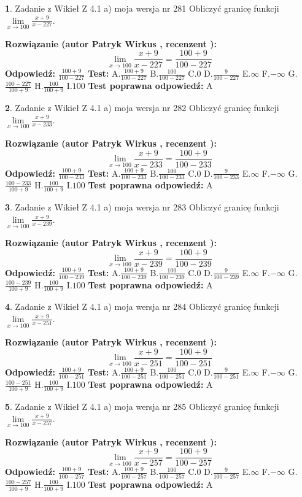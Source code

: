 \documentclass[12pt, a4paper]{article}
\theoremstyle{definition} %
\newtheorem{zad}{}
\newcommand{\zadStart}[1]{\begin{zad}#1\newline}
\newcommand{\zadStop}{\end{zad}}
\newcommand{\rozwStart}[2]{\noindent \textbf{Rozwiązanie (autor #1 , recenzent #2): }\newline}
\newcommand{\rozwStop}{\newline}
\newcommand{\odpStart}{\noindent \textbf{Odpowiedź:}\newline}
\newcommand{\odpStop}{\newline}
\newcommand{\testStart}{\noindent \textbf{Test:}\newline}
\newcommand{\testStop}{\newline}
\newcommand{\kluczStart}{\noindent \textbf{Test poprawna odpowiedź:}\newline}
\newcommand{\kluczStop}{\newline}
\begin{document}
\zadStart{Zadanie z Wikieł Z 4.1 a) moja wersja nr 281}
Obliczyć granicę funkcji $\lim\limits_{x\to100}\frac{x+9}{x-227}$.
\zadStop
\rozwStart{Patryk Wirkus}{}
$$\lim\limits_{x\to100}\frac{x+9}{x-227} = \frac{100+9}{100-227}$$
\rozwStop
\odpStart
$\frac{100+9}{100-227}$
\odpStop
\testStart
A.$\frac{100+9}{100-227}$
B.$\frac{100}{100-227}$
C.$0$
D.$\frac{9}{100-227}$
E.$\infty$
F.$-\infty$
G.$\frac{100-227}{100+9}$
H.$\frac{100}{100+9}$
I.$100$
\testStop
\kluczStart
A
\kluczStop



\zadStart{Zadanie z Wikieł Z 4.1 a) moja wersja nr 282}
Obliczyć granicę funkcji $\lim\limits_{x\to100}\frac{x+9}{x-233}$.
\zadStop
\rozwStart{Patryk Wirkus}{}
$$\lim\limits_{x\to100}\frac{x+9}{x-233} = \frac{100+9}{100-233}$$
\rozwStop
\odpStart
$\frac{100+9}{100-233}$
\odpStop
\testStart
A.$\frac{100+9}{100-233}$
B.$\frac{100}{100-233}$
C.$0$
D.$\frac{9}{100-233}$
E.$\infty$
F.$-\infty$
G.$\frac{100-233}{100+9}$
H.$\frac{100}{100+9}$
I.$100$
\testStop
\kluczStart
A
\kluczStop



\zadStart{Zadanie z Wikieł Z 4.1 a) moja wersja nr 283}
Obliczyć granicę funkcji $\lim\limits_{x\to100}\frac{x+9}{x-239}$.
\zadStop
\rozwStart{Patryk Wirkus}{}
$$\lim\limits_{x\to100}\frac{x+9}{x-239} = \frac{100+9}{100-239}$$
\rozwStop
\odpStart
$\frac{100+9}{100-239}$
\odpStop
\testStart
A.$\frac{100+9}{100-239}$
B.$\frac{100}{100-239}$
C.$0$
D.$\frac{9}{100-239}$
E.$\infty$
F.$-\infty$
G.$\frac{100-239}{100+9}$
H.$\frac{100}{100+9}$
I.$100$
\testStop
\kluczStart
A
\kluczStop



\zadStart{Zadanie z Wikieł Z 4.1 a) moja wersja nr 284}
Obliczyć granicę funkcji $\lim\limits_{x\to100}\frac{x+9}{x-251}$.
\zadStop
\rozwStart{Patryk Wirkus}{}
$$\lim\limits_{x\to100}\frac{x+9}{x-251} = \frac{100+9}{100-251}$$
\rozwStop
\odpStart
$\frac{100+9}{100-251}$
\odpStop
\testStart
A.$\frac{100+9}{100-251}$
B.$\frac{100}{100-251}$
C.$0$
D.$\frac{9}{100-251}$
E.$\infty$
F.$-\infty$
G.$\frac{100-251}{100+9}$
H.$\frac{100}{100+9}$
I.$100$
\testStop
\kluczStart
A
\kluczStop



\zadStart{Zadanie z Wikieł Z 4.1 a) moja wersja nr 285}
Obliczyć granicę funkcji $\lim\limits_{x\to100}\frac{x+9}{x-257}$.
\zadStop
\rozwStart{Patryk Wirkus}{}
$$\lim\limits_{x\to100}\frac{x+9}{x-257} = \frac{100+9}{100-257}$$
\rozwStop
\odpStart
$\frac{100+9}{100-257}$
\odpStop
\testStart
A.$\frac{100+9}{100-257}$
B.$\frac{100}{100-257}$
C.$0$
D.$\frac{9}{100-257}$
E.$\infty$
F.$-\infty$
G.$\frac{100-257}{100+9}$
H.$\frac{100}{100+9}$
I.$100$
\testStop
\kluczStart
A
\kluczStop
\end{document}
